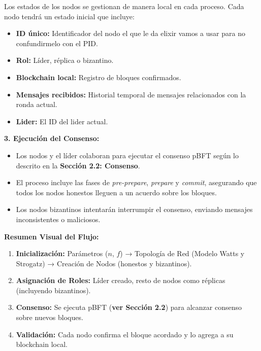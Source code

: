 {{\begin{itemize}
        Los estados de los nodos se gestionan de manera local en cada proceso. Cada nodo tendrá un estado inicial que incluye:
        \begin{itemize}
            \item \textbf{ID único:} Identificador del nodo el que le da elixir vamos a usar para no confundirmelo con el PID.
            \item \textbf{Rol:} Líder, réplica o bizantino.
            \item \textbf{Blockchain local:} Registro de bloques confirmados.
            \item \textbf{Mensajes recibidos:} Historial temporal de mensajes relacionados con la ronda actual.
            \item \textbf{Lider: } El ID del lider actual.
        \end{itemize}
    \end{itemize}

    \vspace{0.5cm}

    \textbf{3. Ejecución del Consenso:}
    \begin{itemize}
        \item Los nodos y el líder colaboran para ejecutar el consenso pBFT según lo descrito en la \textbf{Sección 2.2: Consenso}.
        \item El proceso incluye las fases de \textit{pre-prepare}, \textit{prepare} y \textit{commit}, asegurando que todos los nodos honestos lleguen a un acuerdo sobre los bloques.
        \item Los nodos bizantinos intentarán interrumpir el consenso, enviando mensajes inconsistentes o maliciosos.
    \end{itemize}

    \vspace{0.5cm}

    \textbf{Resumen Visual del Flujo:}
    \begin{enumerate}
        \item \textbf{Inicialización:} Parámetros ($n$, $f$) → Topología de Red (Modelo Watts y Strogatz) → Creación de Nodos (honestos y bizantinos).
        \item \textbf{Asignación de Roles:} Líder creado, resto de nodos como réplicas (incluyendo bizantinos).
        \item \textbf{Consenso:} Se ejecuta pBFT (\textbf{ver Sección 2.2}) para alcanzar consenso sobre nuevos bloques.
        \item \textbf{Validación:} Cada nodo confirma el bloque acordado y lo agrega a su blockchain local.
    \end{enumerate}
}}

\vspace{0.5cm}